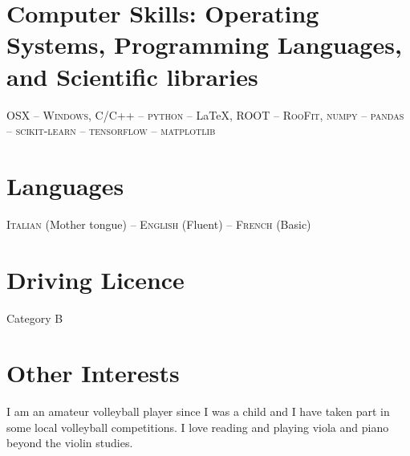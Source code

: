 \documentclass[11pt]{res}
\newcommand{\MarginText}[1]{\section{#1}\vspace{10pt}}
\begin{document}
\begin{resume}


											    














\MarginText{Computer Skills: Operating Systems, Programming Languages, and Scientific libraries}
\textsc{OSX} -- \textsc{Windows}, \textsc{C/C++} -- \textsc{python} -- \LaTeX, \textsc{ROOT} -- \textsc{RooFit}, \textsc{numpy} -- \textsc{pandas} -- \textsc{scikit-learn} -- \textsc{tensorflow} -- \textsc{matplotlib}
\MarginText{Languages}
\textsc{Italian} (Mother tongue) --  \textsc{English} (Fluent) -- \textsc{French} (Basic)
\MarginText{Driving Licence} Category B 
\MarginText{Other Interests} I am an amateur volleyball player since I was a child and I have taken part in some local volleyball competitions. I love reading and playing viola and piano beyond the violin studies.



\end{resume}
\end{document}

